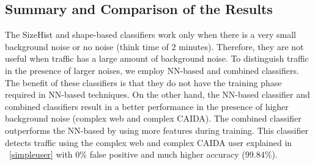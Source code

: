 \subsection{Summary and Comparison of the Results}

The SizeHist and shape-based classifiers work only when there is a very small background noise or no noise (think time of $2$ minutes). Therefore, they are not useful when \bc traffic has a large amount of background noise. To distinguish \bc traffic in the presence of larger noises, we employ NN-based and combined classifiers. The benefit of these classifiers is that they do not have the training phase required in NN-based techniques.
On the other hand, the NN-based classifier and combined classifiers result in a better performance in the presence of higher background noise (complex web and complex CAIDA). The combined classifier outperforms the NN-based by using more features during training. This classifier detects \bc traffic using the complex web and complex CAIDA user explained in ~\ref{simpleuser} with $0\%$ false positive and much higher accuracy ($99.84\%$).


